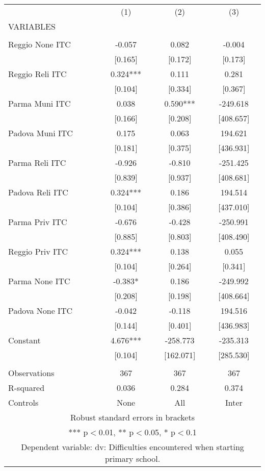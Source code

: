 \begin{tabular}{lccc} \hline
 & (1) & (2) & (3) \\
VARIABLES &  &  &  \\ \hline
 &  &  &  \\
Reggio None ITC & -0.057 & 0.082 & -0.004 \\
 & [0.165] & [0.172] & [0.173] \\
Reggio Reli ITC & 0.324*** & 0.111 & 0.281 \\
 & [0.104] & [0.334] & [0.367] \\
Parma Muni ITC & 0.038 & 0.590*** & -249.618 \\
 & [0.166] & [0.208] & [408.657] \\
Padova Muni ITC & 0.175 & 0.063 & 194.621 \\
 & [0.181] & [0.375] & [436.931] \\
Parma Reli ITC & -0.926 & -0.810 & -251.425 \\
 & [0.839] & [0.937] & [408.681] \\
Padova Reli ITC & 0.324*** & 0.186 & 194.514 \\
 & [0.104] & [0.386] & [437.010] \\
Parma Priv ITC & -0.676 & -0.428 & -250.991 \\
 & [0.885] & [0.803] & [408.490] \\
Reggio Priv ITC & 0.324*** & 0.138 & 0.055 \\
 & [0.104] & [0.264] & [0.341] \\
Parma None ITC & -0.383* & 0.186 & -249.992 \\
 & [0.208] & [0.198] & [408.664] \\
Padova None ITC & -0.042 & -0.118 & 194.516 \\
 & [0.144] & [0.401] & [436.983] \\
Constant & 4.676*** & -258.773 & -235.313 \\
 & [0.104] & [162.071] & [285.530] \\
 &  &  &  \\
Observations & 367 & 367 & 367 \\
R-squared & 0.036 & 0.284 & 0.374 \\
 Controls & None & All & Inter \\ \hline
\multicolumn{4}{c}{ Robust standard errors in brackets} \\
\multicolumn{4}{c}{ *** p$<$0.01, ** p$<$0.05, * p$<$0.1} \\
\multicolumn{4}{c}{ Dependent variable: dv: Difficulties encountered when starting primary school.} \\
\end{tabular}
